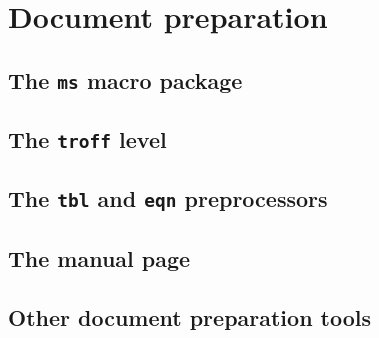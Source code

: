 \chapter{Document preparation}
\label{chap:document_preparation}

\section{The \texttt{ms} macro package}
\section{The \texttt{troff} level}
\section{The \texttt{tbl} and \texttt{eqn} preprocessors}
\section{The manual page}
\section{Other document preparation tools}
